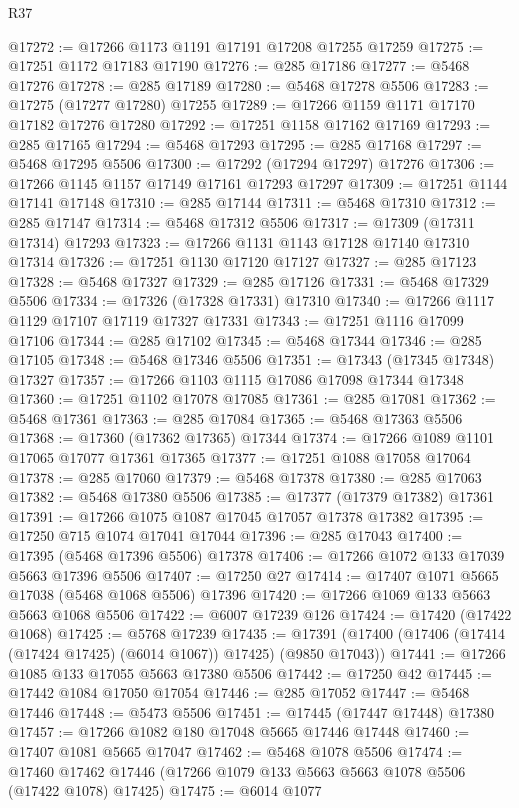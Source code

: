 \begin{lexlean}{R37}
\begin{coremodule}
@17272 := @17266 @1173 @1191 @17191 @17208 @17255 @17259
@17275 := @17251 @1172 @17183 @17190
@17276 := @285 @17186
@17277 := @5468 @17276
@17278 := @285 @17189
@17280 := @5468 @17278 @5506
@17283 := @17275 (@17277 @17280) @17255
@17289 := @17266 @1159 @1171 @17170 @17182 @17276 @17280
@17292 := @17251 @1158 @17162 @17169
@17293 := @285 @17165
@17294 := @5468 @17293
@17295 := @285 @17168
@17297 := @5468 @17295 @5506
@17300 := @17292 (@17294 @17297) @17276
@17306 := @17266 @1145 @1157 @17149 @17161 @17293 @17297
@17309 := @17251 @1144 @17141 @17148
@17310 := @285 @17144
@17311 := @5468 @17310
@17312 := @285 @17147
@17314 := @5468 @17312 @5506
@17317 := @17309 (@17311 @17314) @17293
@17323 := @17266 @1131 @1143 @17128 @17140 @17310 @17314
@17326 := @17251 @1130 @17120 @17127
@17327 := @285 @17123
@17328 := @5468 @17327
@17329 := @285 @17126
@17331 := @5468 @17329 @5506
@17334 := @17326 (@17328 @17331) @17310
@17340 := @17266 @1117 @1129 @17107 @17119 @17327 @17331
@17343 := @17251 @1116 @17099 @17106
@17344 := @285 @17102
@17345 := @5468 @17344
@17346 := @285 @17105
@17348 := @5468 @17346 @5506
@17351 := @17343 (@17345 @17348) @17327
@17357 := @17266 @1103 @1115 @17086 @17098 @17344 @17348
@17360 := @17251 @1102 @17078 @17085
@17361 := @285 @17081
@17362 := @5468 @17361
@17363 := @285 @17084
@17365 := @5468 @17363 @5506
@17368 := @17360 (@17362 @17365) @17344
@17374 := @17266 @1089 @1101 @17065 @17077 @17361 @17365
@17377 := @17251 @1088 @17058 @17064
@17378 := @285 @17060
@17379 := @5468 @17378
@17380 := @285 @17063
@17382 := @5468 @17380 @5506
@17385 := @17377 (@17379 @17382) @17361
@17391 := @17266 @1075 @1087 @17045 @17057 @17378 @17382
@17395 := @17250 @715 @1074 @17041 @17044
@17396 := @285 @17043
@17400 := @17395 (@5468 @17396 @5506) @17378
@17406 := @17266 @1072 @133 @17039 @5663 @17396 @5506
@17407 := @17250 @27
@17414 := @17407 @1071 @5665 @17038 (@5468 @1068 @5506) @17396
@17420 := @17266 @1069 @133 @5663 @5663 @1068 @5506
@17422 := @6007 @17239 @126
@17424 := @17420 (@17422 @1068)
@17425 := @5768 @17239
@17435 := @17391 (@17400 (@17406 (@17414 (@17424 @17425) (@6014 @1067)) @17425) (@9850 @17043))
@17441 := @17266 @1085 @133 @17055 @5663 @17380 @5506
@17442 := @17250 @42
@17445 := @17442 @1084 @17050 @17054
@17446 := @285 @17052
@17447 := @5468 @17446
@17448 := @5473 @5506
@17451 := @17445 (@17447 @17448) @17380
@17457 := @17266 @1082 @180 @17048 @5665 @17446 @17448
@17460 := @17407 @1081 @5665 @17047
@17462 := @5468 @1078 @5506
@17474 := @17460 @17462 @17446 (@17266 @1079 @133 @5663 @5663 @1078 @5506 (@17422 @1078) @17425)
@17475 := @6014 @1077

\end{coremodule}
\end{lexlean}
